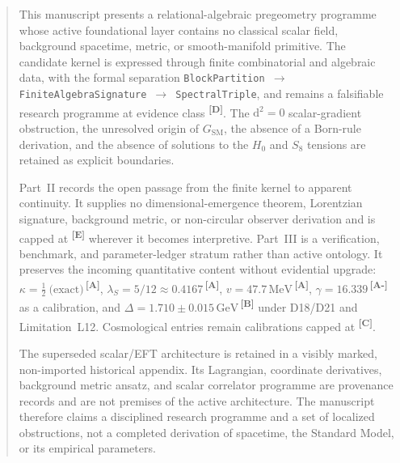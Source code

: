 \documentclass[12pt,a4paper,twoside]{article}
\theoremstyle{plain}
\theoremstyle{definition}
\theoremstyle{remark}
\newcommand{\GeV}{\,\mathrm{GeV}}
\newcommand{\MeV}{\,\mathrm{MeV}}
\newcommand{\catmark}[1]{\textsuperscript{\textsf{\textbf{[#1]}}}}
\newcommand{\lambdaS}{5/12 \approx 0.4167} %
\newcommand{\DeltaGap}{1.710 \pm 0.015\GeV} %
\newcommand{\GammaGeom}{16.339} %
\newcommand{\vVEV}{47.7\MeV} %
\newcommand{\KappaRG}{\tfrac{1}{2}\ \text{(exact)}} %
\begin{document}
\newpage
\tableofcontents
\newpage

\begin{abstract}
\begingroup \normalfont\normalsize
\setlength{\parskip}{0.65em plus 0.12em minus 0.04em}%
\setlength{\parindent}{0pt}%
\noindent This manuscript presents a relational-algebraic pregeometry
programme whose active foundational layer contains no classical scalar field,
background spacetime, metric, or smooth-manifold primitive. The candidate
kernel is expressed through finite combinatorial and algebraic data, with the
formal separation
\texttt{BlockPartition $\to$ FiniteAlgebraSignature $\to$ SpectralTriple},
and remains a falsifiable research programme at evidence class \catmark{D}.
The $\mathrm d^2=0$ scalar-gradient obstruction, the unresolved origin of
$G_{\mathrm{SM}}$, the absence of a Born-rule derivation, and the absence of
solutions to the $H_0$ and $S_8$ tensions are retained as explicit
boundaries.

Part~II records the open passage from the finite kernel to apparent
continuity. It supplies no dimensional-emergence theorem, Lorentzian
signature, background metric, or non-circular observer derivation and is
capped at \catmark{E} wherever it becomes interpretive. Part~III is a
verification, benchmark, and parameter-ledger stratum rather than active
ontology. It preserves the incoming quantitative content without evidential
upgrade: $\kappa=\KappaRG$\,\catmark{A},
$\lambda_S=\lambdaS$\,\catmark{A}, $v=\vVEV$\,\catmark{A},
$\gamma=\GammaGeom$\,\catmark{A-} as a calibration, and
$\Delta=\DeltaGap$\,\catmark{B} under D18/D21 and Limitation~L12.
Cosmological entries remain calibrations capped at \catmark{C}.

The superseded scalar/EFT architecture is retained in a visibly marked,
non-imported historical appendix. Its Lagrangian, coordinate derivatives,
background metric ansatz, and scalar correlator programme are provenance
records and are not premises of the active architecture. The manuscript
therefore claims a disciplined research programme and a set of localized
obstructions, not a completed derivation of spacetime, the Standard Model, or
its empirical parameters.
\endgroup
\end{abstract}

\newpage

\end{document}
